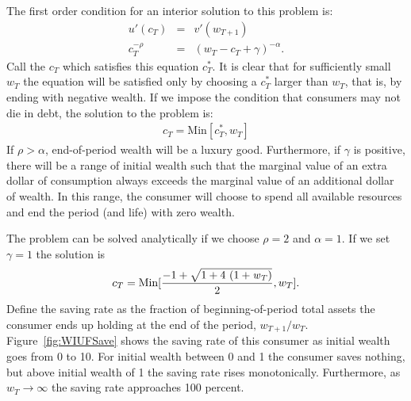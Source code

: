 \documentclass[titlepage,12pt]{article}
\begin{document}
\hypertarget{first-order-condition}{}
The first order condition for an interior solution to this problem is:
\begin{eqnarray}
 	u'(c_{T})    & = & v'(w_{T+1}) \\ \nonumber
 	c_{T}^{-\rho} & = & (w_{T} - c_{T} + \gamma)^{-\alpha}. \nonumber
	\label{eq:LastPeriodEuler}
\end{eqnarray}
Call the $c_{T}$ which satisfies this equation $c_{T}^{*}$.  It is 
clear that for sufficiently small $w_{T}$ the 
equation will be satisfied only by choosing a $c^{*}_{T}$ larger than 
$w_{T}$, that is, by ending with negative wealth.  If we impose the 
condition that consumers may not die in debt, the solution to the 
problem is:
\begin{eqnarray}
 	c_{T} = \mbox{Min}[c^{*}_{T}, w_{T}]  \nonumber
	\label{eq:LastPeriodSoln}
\end{eqnarray}
If $\rho > \alpha$, end-of-period wealth will be a luxury good.  Furthermore, 
if $\gamma$ is positive, there will be a range of initial wealth such 
that the marginal value of an extra dollar of consumption always 
exceeds the marginal value of an additional dollar of wealth.  In this 
range, the consumer will choose to spend all available resources and 
end the period (and life) with zero wealth.

The problem can be solved analytically if we choose $\rho = 2$ and 
$\alpha = 1$.  If we set $\gamma=1$ the solution is
\begin{eqnarray}
    c_{T}=\mbox{Min}[ {{-1 + {\sqrt{1 + 4\,\left( 1 + {\it w_{T}} \right) }}}\over 2}  ,w_{T}].
	\label{eq:GraphSoln}
\end{eqnarray}
Define the saving rate as the fraction of beginning-of-period total 
assets the consumer ends up holding at the end of the period, 
$w_{T+1}/w_{T}$.  Figure~\ref{fig:WIUFSave} shows the saving rate of 
this consumer as initial wealth goes from 0 to 10.  For initial wealth 
between 0 and 1 the consumer saves nothing, but above initial wealth 
of 1 the saving rate rises monotonically.  Furthermore, as $w_{T} 
\rightarrow \infty$ the saving rate approaches 100 percent.  

\end{document}
